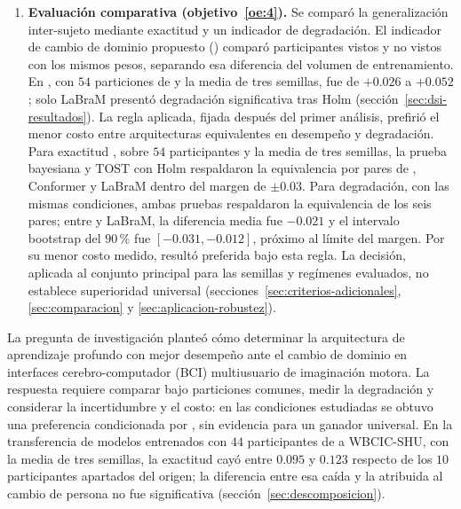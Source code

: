 \begin{enumerate}
  \item \textbf{Evaluación comparativa (objetivo~\ref{oe:4}).} Se comparó la generalización
  inter-sujeto mediante exactitud y un indicador de degradación. El indicador de cambio de
  dominio propuesto (\dsi{}) comparó participantes vistos y no vistos con los mismos pesos,
  separando esa diferencia del volumen de entrenamiento. En \loso{}, con $54$ particiones
  de \openbmi{} y la media de tres semillas, fue de $+0.026$ a $+0.052$; solo LaBraM presentó
  degradación significativa tras Holm (sección~\ref{sec:dsi-resultados}). La regla aplicada,
  fijada después del primer análisis, prefirió el menor costo entre arquitecturas equivalentes
  en desempeño y degradación. Para exactitud \loso{}, sobre $54$ participantes y la media de
  tres semillas, la prueba bayesiana y TOST con Holm respaldaron la equivalencia por pares de
  \eegnet{}, Conformer y LaBraM dentro del margen de $\pm 0.03$. Para degradación, con las
  mismas condiciones, ambas pruebas respaldaron la equivalencia de los seis pares; entre
  \eegnet{} y LaBraM, la diferencia media fue $-0.021$ y el intervalo bootstrap del
  $90$\,\% fue $[-0.031, -0.012]$, próximo al límite del margen. Por su menor costo
  medido, \eegnet{} resultó preferida bajo esta regla. La decisión, aplicada al conjunto
  principal para las semillas y regímenes evaluados, no establece superioridad universal
  (secciones~\ref{sec:criterios-adicionales}, \ref{sec:comparacion} y
  \ref{sec:aplicacion-robustez}).
\end{enumerate}

La pregunta de investigación planteó cómo determinar la arquitectura de aprendizaje profundo
con mejor desempeño ante el cambio de dominio en interfaces cerebro-computador (BCI)
multiusuario de imaginación motora. La respuesta requiere comparar bajo particiones comunes,
medir la degradación y considerar la incertidumbre y el costo: en las condiciones estudiadas
se obtuvo una preferencia condicionada por \eegnet{}, sin evidencia para un ganador universal.
En la transferencia de modelos entrenados con $44$ participantes de \openbmi{} a WBCIC-SHU,
con la media de tres semillas, la exactitud cayó entre $0.095$ y $0.123$ respecto de los
$10$ participantes apartados del origen; la diferencia entre esa caída y la atribuida al
cambio de persona no fue significativa (sección~\ref{sec:descomposicion}).

